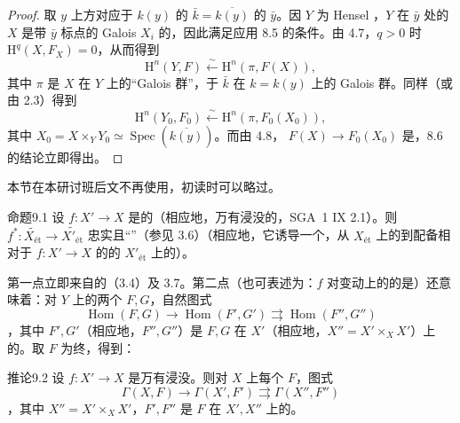 \begin{proof}
取 $y$ 上方对应于 $k(y)$ 的 $\bar k=\overline{k(y)}$ 的 $\bar y$。因 $Y$ 为 Hensel ，$Y$ 在 $\bar y$ 处的 $X$ 是带 $\bar y$ 标点的 Galois  $X_i$ 的，因此满足应用 8.5 的条件。由 4.7，$q>0$ 时 $\mathrm H^q(X,F_X)=0$，从而得到
\[\mathrm H^n(Y,F)\xleftarrow{\sim}\mathrm H^n(\pi,F(X)),\]
其中 $\pi$ 是 $X$ 在 $Y$ 上的“Galois 群”，于 $\bar k$ 在 $k=k(y)$ 上的 Galois 群。同样（或由 2.3）得到
\[\mathrm H^n(Y_0,F_0)\xleftarrow{\sim}\mathrm H^n(\pi,F_0(X_0)),\]
其中 $X_0=X\times_Y Y_0\simeq\operatorname{Spec}(\overline{k(y)})$。而由 4.8， $F(X)\to F_0(X_0)$ 是，8.6 的结论立即得出。
\end{proof}
本节在本研讨班后文不再使用，初读时可以略过。
\begin{SGAresult}{命题}{9.1}
设 $f:X'\to X$ 是的（相应地，万有浸没的，SGA~1 IX 2.1）。则 $f^*:\widetilde{X_{\text{ét}}}\to\widetilde{X'_{\text{ét}}}$ 忠实且“”（参见 3.6）（相应地，它诱导一个，从 $X_{\text{ét}}$ 上的到配备相对于 $f:X'\to X$ 的的 $X'_{\text{ét}}$ 上的）。
\end{SGAresult}
第一点立即来自的（3.4）及 3.7。第二点（也可表述为：$f$ 对变动上的的是）还意味着：对 $Y$ 上的两个 $F,G$，自然图式
\[\operatorname{Hom}(F,G)\longrightarrow\operatorname{Hom}(F',G')\rightrightarrows\operatorname{Hom}(F'',G'')\tag{*}\]
，其中 $F',G'$（相应地，$F'',G''$）是 $F,G$ 在 $X'$（相应地，$X''=X'\times_X X'$）上的。取 $F$ 为终，得到：
\begin{SGAresult}{推论}{9.2}
设 $f:X'\to X$ 是万有浸没。则对 $X$ 上每个 $F$，图式
\[\Gamma(X,F)\longrightarrow\Gamma(X',F')\rightrightarrows\Gamma(X'',F'')\]
，其中 $X''=X'\times_X X'$，$F',F''$ 是 $F$ 在 $X',X''$ 上的。
\end{SGAresult}
